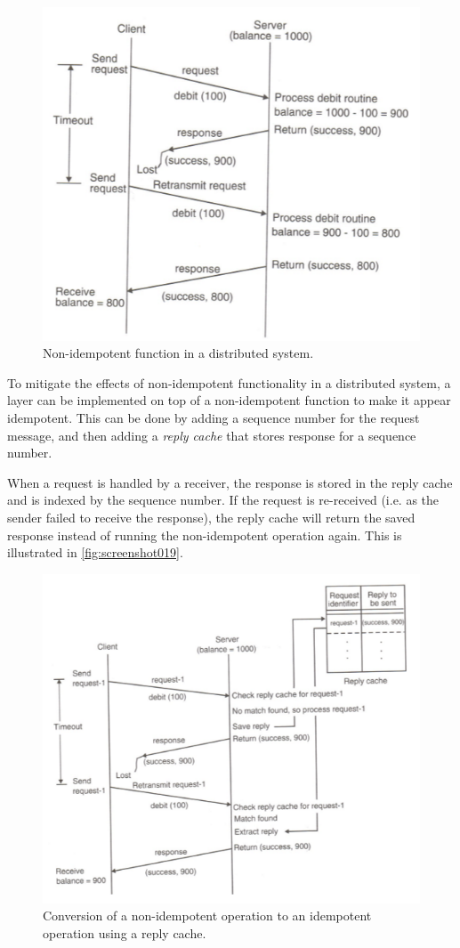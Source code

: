 \begin{figure}[h]
\centering
\includegraphics[width=0.55\linewidth]{screenshot018}
\caption{Non-idempotent function in a distributed system.}
\label{fig:screenshot018}
\end{figure}

To mitigate the effects of non-idempotent functionality in a distributed system, a layer can be implemented on top of a non-idempotent function to make it appear idempotent. This can be done by adding a sequence number for the request message, and then adding a \textit{reply cache} that stores response for a sequence number.

When a request is handled by a receiver, the response is stored in the reply cache and is indexed by the sequence number. If the request is re-received (i.e. as the sender failed to receive the response), the reply cache will return the saved response instead of running the non-idempotent operation again. This is illustrated in \autoref{fig:screenshot019}.

\begin{figure}
\centering
\includegraphics[width=0.7\linewidth]{screenshot019}
\caption[Non-idempotent to idempotent using reply cache]{Conversion of a non-idempotent operation to an idempotent operation using a reply cache.}
\label{fig:screenshot019}
\end{figure}

